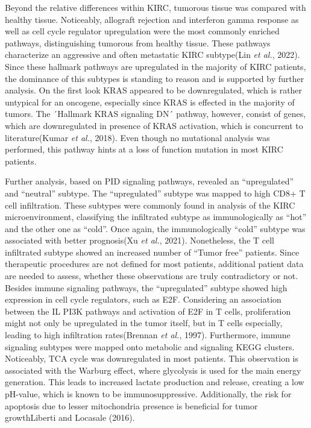 \documentclass[
  parskip,
  oneside]{scrreprt}
\begin{document}
Beyond the relative differences within KIRC, tumorous tissue was
compared with healthy tissue. Noticeably, allograft rejection and
interferon gamma response as well as cell cycle regulator upregulation
were the most commonly enriched pathways, distinguishing tumorous from
healthy tissue. These pathways characterize an aggressive and often
metastatic KIRC subtype(Lin \emph{et al.}, 2022). Since these hallmark
pathways are upregulated in the majority of KIRC patients, the dominance
of this subtypes is standing to reason and is supported by further
analysis. On the first look KRAS appeared to be downregulated, which is
rather untypical for an oncogene, especially since KRAS is effected in
the majority of tumors. The ´Hallmark KRAS signaling DN´ pathway,
however, consist of genes, which are downregulated in presence of KRAS
activation, which is concurrent to literature(Kumar \emph{et al.},
2018). Even though no mutational analysis was performed, this pathway
hints at a loss of function mutation in most KIRC patients.

Further analysis, based on PID signaling pathways, revealed an
``upregulated'' and ``neutral'' subtype. The ``upregulated'' subtype was
mapped to high CD8+ T cell infiltration. These subtypes were commonly
found in analysis of the KIRC microenvironment, classifying the
infiltrated subtype as immunologically as ``hot'' and the other one as
``cold''. Once again, the immunologically ``cold'' subtype was
associated with better prognosis(Xu \emph{et al.}, 2021). Nonetheless,
the T cell infiltrated subtype showed an increased number of ``Tumor
free'' patients. Since therapeutic procedures are not defined for most
patients, additional patient data are needed to assess, whether these
observations are truly contradictory or not. Besides immune signaling
pathways, the ``upregulated'' subtype showed high expression in cell
cycle regulators, such as E2F. Considering an association between the IL
PI3K pathways and activation of E2F in T cells, proliferation might not
only be upregulated in the tumor itself, but in T cells especially,
leading to high infiltration rates(Brennan \emph{et al.}, 1997).
Furthermore, immune signaling subtypes were mapped onto metabolic and
signaling KEGG clusters. Noticeably, TCA cycle was downregulated in most
patients. This observation is associated with the Warburg effect, where
glycolysis is used for the main energy generation. This leads to
increased lactate production and release, creating a low pH-value, which
is known to be immunosuppressive. Additionally, the risk for apoptosis
due to lesser mitochondria presence is beneficial for tumor
growthLiberti and Locasale (2016).
\end{document}
